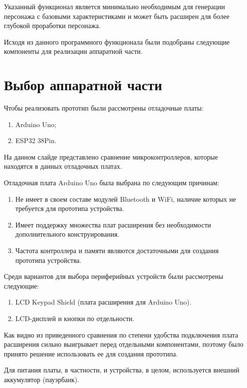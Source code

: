 \documentclass[12pt,a4paper]{article}
\begin{document}
Указанный функционал является минимально необходимым для генерации персонажа с базовыми характеристиками и может быть расширен для более глубокой проработки персонажа.

Исходя из данного программного функционала были подобраны следующие компоненты для реализации аппаратной части.

\section{Выбор аппаратной части}

Чтобы реализовать прототип были рассмотрены отладочные платы:

\begin{enumerate}
    \item Arduino Uno;
    \item ESP32 38Pin.
\end{enumerate}

На данном слайде представлено сравнение микроконтроллеров, которые находятся в данных отладочных платах.

Отладочная плата Arduino Uno была выбрана по следующим причинам:

\begin{enumerate}
    \item Не имеет в своем составе модулей Bluetooth и WiFi, наличие которых не требуется для прототипа устройства.
    \item Имеет поддержку множества плат расширения без необходимости дополнительного конструирования.
    \item Частота контроллера и памяти являются достаточными для создания прототипа устройства.
\end{enumerate}

Среди вариантов для выбора периферийных устройств были рассмотрены следующие:

\begin{enumerate}
    \item LCD Keypad Shield (плата расширения для Arduino Uno).
    \item LCD-дисплей и кнопки по отдельности.
\end{enumerate}

Как видно из приведенного сравнения по степени удобства подключения плата расширения сильно выигрывает перед отдельными компонентами, поэтому было принято решение использовать ее для создания прототипа.

Для питания платы, в частности, и устройства, в целом, используется внешний аккумулятор (пауэрбанк).
\end{document}

